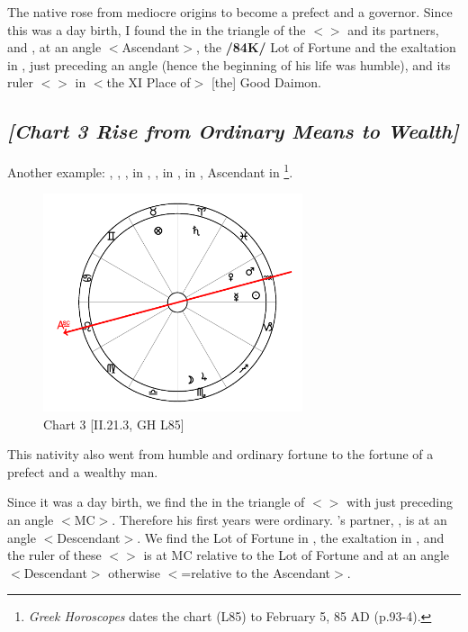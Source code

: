 The native rose from mediocre origins to become a prefect and a governor. Since this was a day birth, I found the \Sun\xspace in the triangle of the \Moon\xspace $<$\Taurus\xspace \Virgo\xspace \Capricorn$>$ and its partners, \Venus\xspace and \Mars, at an angle $<$Ascendant$>$, the \textbf{/84K/} Lot of Fortune and the exaltation in \Gemini, just preceding an angle (hence the beginning of his life was humble), and its ruler $<$\Mercury$>$ in $<$the XI Place of$>$ [the] Good Daimon.
\newpage

\subsection*{\textit{[Chart 3 Rise from Ordinary Means to Wealth]}}

Another example: \Sun, \Mars, \Venus, \Mercury\xspace in \Aquarius, \Moon, \Jupiter\xspace in \Scorpio, \Saturn\xspace in \Aries, Ascendant in \Leo
\footnote{\textit{Greek Horoscopes} dates the chart (L85) to February 5, 85 AD (p.93-4).}.

\clearpage
\begin{figure}
\centering
\vspace{-20pt}
\includegraphics[width=0.68\textwidth]{charts/2_21_3}
\caption{Chart 3 [II.21.3, GH L85]}
\label{fig:chart03}
\end{figure}

This nativity also went from humble and ordinary fortune to the fortune of a prefect and a wealthy man. 

Since it was a day birth, we find the \Sun\xspace in the triangle of \Saturn\xspace $<$\Aquarius\xspace \Gemini\xspace \Libra$>$ with \Saturn\xspace just preceding an angle $<$MC$>$. Therefore his first years were ordinary. \Saturn’s partner, \Mercury, is at an angle $<$Descendant$>$. We find the Lot of Fortune in \Taurus, the exaltation in \Libra, and the ruler of these $<$\Venus$>$ is at MC relative to the Lot of Fortune and at an angle $<$Descendant$>$ otherwise $<$=relative to the Ascendant$>$.
\newpage
